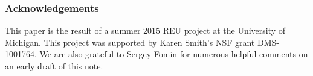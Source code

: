 \documentclass[ALCO,published]{cedram}
\numberwithin{equation}{section}
\newcommand{\B}{\mathcal{B}}
\renewcommand{\L}{\mathcal{L}}%
\newcommand{\1}{^{-1}}
\def\Q{\mathsf{Q}}
\begin{document}
%
%
%

\subsubsection*{Acknowledgements}
This paper is the result of a summer 2015 REU project at the University of Michigan. This project was supported by Karen Smith's NSF grant DMS-1001764. We are also grateful to Sergey Fomin for numerous helpful comments on an early draft of this note.










\end{document}
